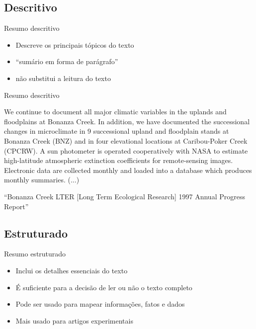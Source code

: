 \documentclass{beamer}
\begin{document}
\subsection{Descritivo}

\begin{frame}{Resumo descritivo}
  \begin{itemize}
  \item Descreve os principais tópicos do texto
  \item ``sumário em forma de parágrafo''
  \item não substitui a leitura do texto
  \end{itemize}
\end{frame}

\begin{frame}{Resumo descritivo}
  \begin{example}
    We continue to document all major climatic variables in the
    uplands and floodplains at Bonanza Creek. In addition, we have
    documented the successional changes in microclimate in 9
    successional upland and floodplain stands at Bonanza Creek (BNZ)
    and in four elevational locations at Caribou-Poker Creek
    (CPCRW). A sun photometer is operated cooperatively with NASA to
    estimate high-latitude atmospheric extinction coefficients for
    remote-sensing images. Electronic data are collected monthly and
    loaded into a database which produces monthly summaries.  (...)
  \end{example}
  ``Bonanza Creek LTER [Long Term Ecological Research] 1997 Annual
  Progress Report''
\end{frame}

\subsection{Estruturado}

\begin{frame}{Resumo estruturado}
  \begin{itemize}
  \item Inclui os detalhes essenciais do texto
  \item É suficiente para a decisão de ler ou não o texto completo
  \item Pode ser usado para mapear informações, fatos e dados
  \item Mais usado para artigos experimentais
  \end{itemize}
\end{frame}
\end{document}
